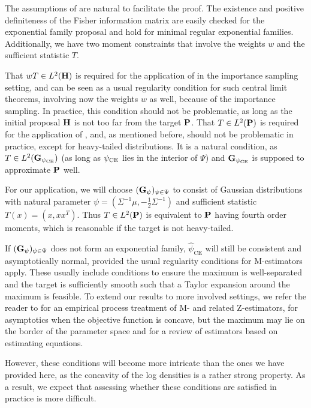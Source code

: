 The assumptions of  are natural to facilitate the proof. The existence and positive definiteness of the Fisher information matrix are easily checked for the exponential family proposal and hold for minimal regular exponential families. Additionally, we have two moment constraints that involve the weights $w$ and the sufficient statistic $T$. 

That $wT \in L^{2}(\H)$ is required for the application of  in the importance sampling setting, and can be seen as a usual regularity condition for such central limit theorems, involving now the weights $w$ as well, because of the importance sampling. In practice, this condition should not be problematic, as long as the initial proposal $\H$ is not too far from the target $\P$.
That $T\in L^{2}(\P)$ is required for the application of , and, as mentioned before, should not be problematic in practice, except for heavy-tailed distributions. It is a natural condition, as $T \in L^{2}(\G_{\pce})$ (as long as $\pce$ lies in the interior of $\Psi$) and $\G_{\pce}$ is supposed to approximate $\P$ well.

For our application, we will choose $(\G_{\psi})_{\psi \in \Psi}$ to consist of Gaussian distributions with natural parameter $\psi = \left( \Sigma^{-1}\mu, -\frac{1}{2}\Sigma^{-1}\right)$ and sufficient statistic $T(x) = \left( x, xx^{T} \right)$. Thus $T\in L^{2}(\P)$ is equivalent to $\P$ having fourth order moments, which is reasonable if the target is not heavy-tailed.

If $(\G_\psi)_{\psi \in \Psi}$ does not form an exponential family, $\hat\psi_{\text{CE}}$ will still be consistent and asymptotically normal, provided the usual regularity conditions for M-estimators apply.
These usually include conditions to ensure the maximum is well-separated and the target is sufficiently smooth such that a Taylor expansion around the maximum is feasible.
To extend our results to more involved settings, we refer the reader to \citep{VanderVaart2000Asymptotic} for an empirical process treatment of M- and related Z-estimators, \citep{Haberman1989Concavity} for asymptotics when the objective function is concave, but the maximum may lie on the border of the parameter space and \citep{Liang1995Inference} for a review of estimators based on estimating equations.

However, these conditions will become more intricate than the ones we have provided here, as the concavity of the log densities is a rather strong property. As a result, we expect that assessing whether these conditions are satisfied in practice is more difficult. 